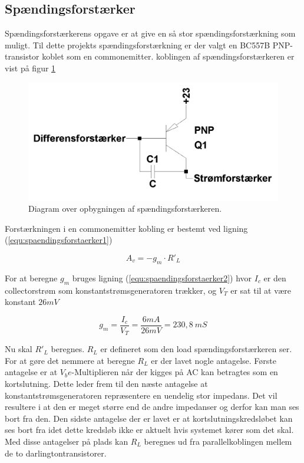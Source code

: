 \subsection{Spændingsforstærker}
\label{effekt_spaendingsforstaerker}
Spændingsforstærkerens opgave er at give en så stor spændingsforstærkning som muligt. Til dette projekts spændingsforstærkning er der valgt en BC557B PNP-transistor koblet som en commonemitter. koblingen af spændingsforstærkeren er vist på figur \ref{spaendingsforstaerker_diagram}

\begin{figure}[h]
\centering
\includegraphics[scale=0.2]{teknisk/effektforstaerker/spaendingsforstaerker_diagram.png}
\caption{Diagram over opbygningen af spændingsforstærkeren.}
\label{spaendingsforstaerker_diagram}
\end{figure}

Forstærkningen i en commonemitter kobling er bestemt ved ligning (\ref{equ:spaendingsforstaerker1}) 

\begin{equation}
\label{equ:spaendingsforstaerker1}
A_v = -g_m \cdot R'_L
\end{equation}

For at beregne $g_m$ bruges ligning (\ref{equ:spaendingsforstaerker2}) hvor $I_c$ er den collectorstrøm som konstantstrømsgeneratoren trækker, og $V_T$ er sat til at være konstant $26 mV$

\begin{equation}
\label{equ:spaendingsforstaerker2}
g_m = \frac{I_c}{V_T} = \frac{6 mA}{26 mV} = 230,8~mS
\end{equation}

Nu skal $R'_L$ beregnes. $R_L$ er defineret som den load spændingsforstærkeren ser. For at gøre det nemmere at beregne $R_L$ er der lavet nogle antagelse. Første antagelse er at $V_be$-Multiplieren når der kigges på AC kan betragtes som en kortslutning. Dette leder frem til den næste antagelse at konstantstrømsgeneratoren repræsentere en uendelig stor impedans. Det vil resultere i at den er meget større end de andre impedanser og derfor kan man ses bort fra den. Den sidste antagelse der er lavet er at kortslutningskredsløbet kan ses bort fra idet dette kredsløb ikke er aktuelt hvis systemet  kører som det skal. Med disse antagelser på plads kan $R_L$ beregnes ud fra parallelkoblingen mellem de to darlingtontransistorer.



